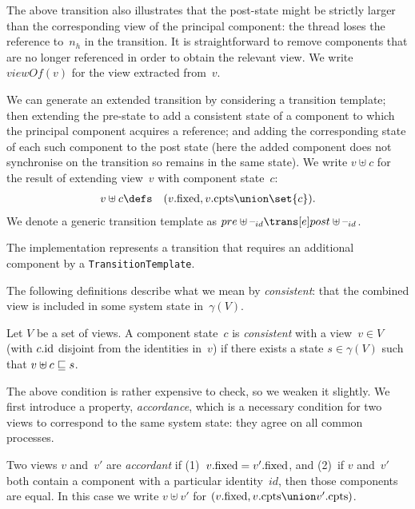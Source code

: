 The above transition also illustrates that the post-state might be strictly
larger than the corresponding view of the principal component: the thread
loses the reference to~$n_h$ in the transition.  It is straightforward to
remove components that are no longer referenced in order to obtain the
relevant view.  We write $viewOf(v)$ for the view extracted from~$v$. 

We can generate an extended transition by considering a transition template;
then extending the pre-state to add a consistent state of a component to which
the principal component acquires a reference; and adding the corresponding
state of each such component to the post state (here the added component does
not synchronise on the transition so remains in the same state).  We write $v
\uplus c$ for the result of extending view~$v$ with component state~$c$:
\begin{eqnarray*}
v \uplus c & \defs & (v.\fixed, v.\cpts \union \set{c}).
\end{eqnarray*}
%
We denote a generic transition template as $pre \uplus \hole{id} \trans[e]
post \uplus \hole{id}$. 

\begin{impNote}
The implementation represents a transition that requires an
  additional component by a \texttt{TransitionTemplate}.
\end{impNote}

The following definitions describe what we mean by \emph{consistent}: that the
combined view is included in some system state in~$\gamma(V)$.
%
\begin{definition}
Let $V$ be a set of views.  A component state~$c$ is \emph{consistent} with a
view~$v \in V$ (with $c.\mathrm{id}$ disjoint from the identities in~$v$) if there
exists a state $s \in \gamma(V)$ such that $v \uplus c \sqsubseteq s$.
\end{definition}
%
The above condition is rather expensive to check, so we weaken it slightly.
We first introduce a property, \emph{accordance}, which is a necessary
condition for two views to correspond to the same system state: they agree on
all common processes.
%
\begin{definition}
Two views $v$ and~$v'$ are \emph{accordant} if (1)~$v.\mathrm{fixed} = v'.\mathrm{fixed}$, and
(2)~if $v$ and~$v'$ both contain a component with a particular identity~$id$,
then those components are equal.  In this case we write $v \uplus v'$ for
$(v.\fixed, v.\cpts \union v'.\cpts)$.  
\end{definition}


